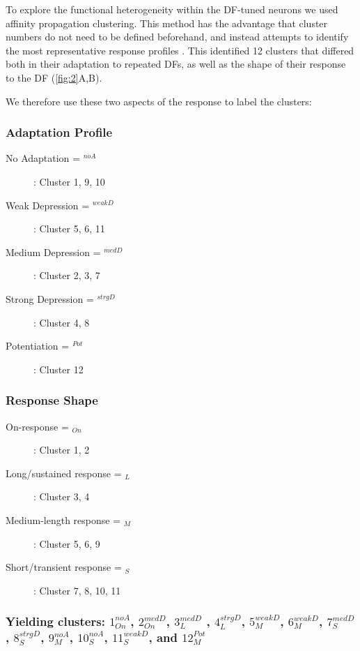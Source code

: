 \documentclass[9pt,lineno]{RandlettLab_elife}
\begin{document}
To explore the functional heterogeneity within the DF-tuned neurons we used affinity propagation clustering. This method has the advantage that cluster numbers do not need to be defined beforehand, and instead attempts to identify the most representative response profiles \citep{Forster2020-lg}.  This identified 12 clusters that differed both in their adaptation to repeated DFs, as well as the shape of their response to the DF (\autoref{fig:2}A,B). 

We therefore use these two aspects of the response to label the clusters:

\subsubsection{Adaptation Profile}
\vspace{1.5mm}

\begin{description}
\item[No Adaptation = $^{noA}$ ]    : 	Cluster 1, 9, 10
\item[Weak Depression = $^{weakD}$ ]    : 	Cluster 5, 6, 11
\item[Medium Depression = $^{medD}$ ]    : 	Cluster 2, 3, 7
\item[Strong Depression = $^{strgD}$ ]    : 	Cluster 4, 8
\item[Potentiation = $^{Pot}$ ]    : 	Cluster 12
\end{description}



\subsubsection{Response Shape}
\vspace{1.5mm}
\begin{description}
\item[On-response = $_{On}$]    : 	Cluster 1, 2
\item[Long/sustained response = $_{L}$]    : 	Cluster 3, 4
\item[Medium-length response = $_{M}$]    : 	Cluster 5, 6, 9
\item[Short/transient response = $_{S}$]    : 	Cluster 7, 8, 10, 11

\end{description}

\subsubsection{Yielding clusters: $1_{On}^{noA}$, $2_{On}^{medD}$, $3_{L}^{medD}$ , $4_{L}^{strgD}$, $5_{M}^{weakD}$, $6_{M}^{weakD}$, $7_{S}^{medD}$, $8_{S}^{strgD}$, $9_{M}^{noA}$, $10_{S}^{noA}$, $11_{S}^{weakD}$, and $12_{M}^{Pot}$}
\end{document}
